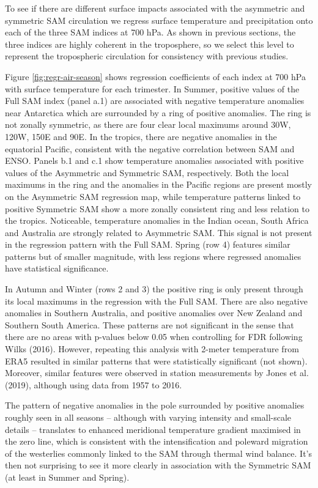 \documentclass[smallextended]{svjour3}       %
\begin{document}
To see if there are different surface impacts associated with the asymmetric and symmetric SAM circulation we regress surface temperature and precipitation onto each of the three SAM indices at 700 hPa. As shown in previous sections, the three indices are highly coherent in the troposphere, so we select this level to represent the tropospheric circulation for consistency with previous studies.

Figure \ref{fig:regr-air-season} shows regression coefficients of each index at 700 hPa with surface temperature for each trimester. In Summer, positive values of the Full SAM index (panel a.1) are associated with negative temperature anomalies near Antarctica which are surrounded by a ring of positive anomalies. The ring is not zonally symmetric, as there are four clear local maximums around 30\degree W, 120\degree W, 150\degree E and 90\degree E. In the tropics, there are negative anomalies in the equatorial Pacific, consistent with the negative correlation between SAM and ENSO. Panels b.1 and c.1 show temperature anomalies associated with positive values of the Asymmetric and Symmetric SAM, respectively. Both the local maximums in the ring and the anomalies in the Pacific regions are present mostly on the Asymmetric SAM regression map, while temperature patterns linked to positive Symmetric SAM show a more zonally consistent ring and less relation to the tropics. Noticeable, temperature anomalies in the Indian ocean, South Africa and Australia are strongly related to Asymmetric SAM. This signal is not present in the regression pattern with the Full SAM. Spring (row 4) features similar patterns but of smaller magnitude, with less regions where regressed anomalies have statistical significance.

In Autumn and Winter (rows 2 and 3) the positive ring is only present through its local maximums in the regression with the Full SAM. There are also negative anomalies in Southern Australia, and positive anomalies over New Zealand and Southern South America. These patterns are not significant in the sense that there are no areas with p-values below 0.05 when controlling for FDR following Wilks (2016). However, repeating this analysis with 2-meter temperature from ERA5 resulted in similar patterns that were statistically significant (not shown). Moreover, similar features were observed in station measurements by Jones et al. (2019), although using data from 1957 to 2016.

The pattern of negative anomalies in the pole surrounded by positive anomalies roughly seen in all seasons -- although with varying intensity and small-scale details -- translates to enhanced meridional temperature gradient maximised in the zero line, which is consistent with the intensification and poleward migration of the westerlies commonly linked to the SAM through thermal wind balance. It's then not surprising to see it more clearly in association with the Symmetric SAM (at least in Summer and Spring).
\end{document}
